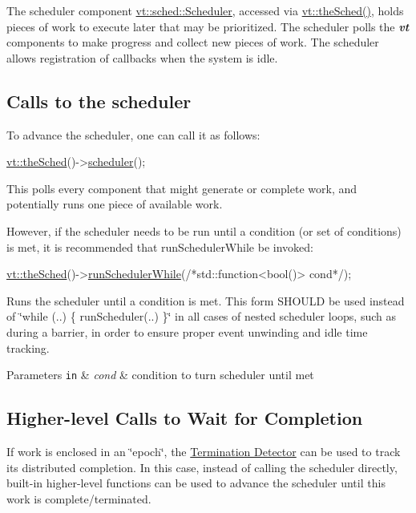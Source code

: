 The scheduler component {\ttfamily \hyperlink{structvt_1_1sched_1_1_scheduler}{vt\+::sched\+::\+Scheduler}}, accessed via {\ttfamily \hyperlink{namespacevt_a4508b38e6ab664b64f1415aecbb83571}{vt\+::the\+Sched()}}, holds pieces of work to execute later that may be prioritized. The scheduler polls the {\bfseries {\itshape vt}} components to make progress and collect new pieces of work. The scheduler allows registration of callbacks when the system is idle.\hypertarget{scheduler_calls-to-the-scheduler}{}\subsection{Calls to the scheduler}\label{scheduler_calls-to-the-scheduler}
To advance the scheduler, one can call it as follows\+:


\begin{DoxyCode}
\hyperlink{namespacevt_a4508b38e6ab664b64f1415aecbb83571}{vt::theSched}()->\hyperlink{structvt_1_1sched_1_1_scheduler_ad2653b260780c89a20e9253608ef1282}{scheduler}();
\end{DoxyCode}


This polls every component that might generate or complete work, and potentially runs one piece of available work.

However, if the scheduler needs to be run until a condition (or set of conditions) is met, it is recommended that {\ttfamily run\+Scheduler\+While} be invoked\+:


\begin{DoxyCode}
\hyperlink{namespacevt_a4508b38e6ab664b64f1415aecbb83571}{vt::theSched}()->\hyperlink{structvt_1_1sched_1_1_scheduler_a9c130fc0ccbf237633420a7aa35069a4}{runSchedulerWhile}(\textcolor{comment}{/*std::function<bool()> cond*/});
\end{DoxyCode}


Runs the scheduler until a condition is met. This form S\+H\+O\+U\+LD be used instead of \char`\"{}while (..) \{ run\+Scheduler(..) \}\char`\"{} in all cases of nested scheduler loops, such as during a barrier, in order to ensure proper event unwinding and idle time tracking.


\begin{DoxyParams}[1]{Parameters}
\mbox{\tt in}  & {\em cond} & condition to turn scheduler until met\\
\hline
\end{DoxyParams}
\hypertarget{scheduler_higher-level-calls}{}\subsection{Higher-\/level Calls to Wait for Completion}\label{scheduler_higher-level-calls}
If work is enclosed in an \char`\"{}epoch\char`\"{}, the \hyperlink{term}{Termination Detector} can be used to track its distributed completion. In this case, instead of calling the scheduler directly, built-\/in higher-\/level functions can be used to advance the scheduler until this work is complete/terminated.


